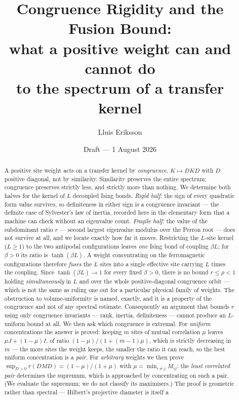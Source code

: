 \documentclass[11pt,a4paper]{article}
\title{Congruence Rigidity and the Fusion Bound:\\
what a positive weight can and cannot do\\
to the spectrum of a transfer kernel}
\author{Lluis Eriksson}
\date{Draft --- 1 August 2026}
\theoremstyle{plain}
\theoremstyle{definition}
\begin{document}
\maketitle

\begin{abstract}
A positive site weight acts on a transfer kernel by \emph{congruence},
$K \mapsto DKD$ with $D$ positive diagonal, not by similarity. Similarity
preserves the entire spectrum; congruence preserves strictly less, and strictly
more than nothing. We determine both halves for the kernel of $L$ decoupled
Ising bonds. \emph{Rigid half:} the sign of every quadratic form value survives,
so definiteness in either sign is a congruence invariant --- the definite case
of Sylvester's law of inertia, recorded here in the elementary form that a
machine can check without an eigenvalue count. \emph{Fragile half:} the value of
the subdominant ratio $r$ --- second largest eigenvalue modulus over the Perron
root --- does not survive at all, and we locate exactly how far it moves.
Restricting the $L$-site kernel ($L\ge1$) to the two antipodal configurations
leaves \emph{one} Ising bond of coupling $\beta L$; for $\beta>0$ its ratio is
$\tanh(\beta L)$. A weight concentrating on the ferromagnetic
configurations therefore \emph{fuses} the $L$ sites into a single effective site
carrying $L$ times the coupling. Since $\tanh(\beta L)\to 1$ for every fixed
$\beta>0$, there is no bound $r\le\rho<1$ holding \emph{simultaneously} in $L$
and over the whole positive-diagonal congruence orbit --- which is not the same
as ruling one out for a particular physical family of weights. The obstruction
to volume-uniformity is named, exactly, and it is a property of the congruence
and not of any spectral estimate.
Consequently an argument that bounds $r$ using only congruence invariants ---
rank, inertia, definiteness --- cannot produce an $L$-uniform bound at all.
We then ask which congruence is extremal. For \emph{uniform} concentrations the
answer is proved: keeping $m$ sites of mutual correlation $\mu$ leaves
$\mu J+(1-\mu)I$, of ratio $(1-\mu)/(1+(m-1)\mu)$, which is strictly decreasing
in $m$ --- the more sites the weight keeps, the smaller the ratio it can reach,
so the best uniform concentration is a \emph{pair}. For \emph{arbitrary} weights
we then prove
$\sup_{D>0}r(DMD)=(1-\mu)/(1+\mu)$ with $\mu=\min_{i\neq j}M_{ij}$: the
\emph{least correlated pair} determines the supremum, which is approached by
concentrating on such a pair. (We evaluate the supremum; we do not classify its
maximisers.) The proof is
geometric rather than spectral --- Hilbert's projective diameter is itself a

\end{abstract}
\end{document}
